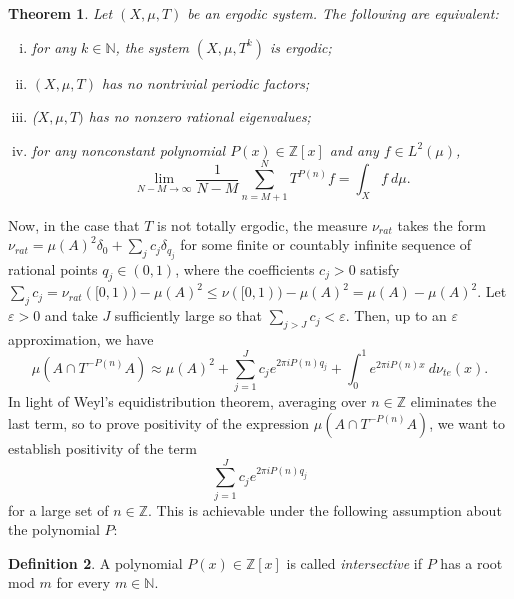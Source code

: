 \documentclass{amsart}
\newtheorem{theorem}{Theorem}[section]
\theoremstyle{definition}
\newtheorem{definition}[theorem]{Definition}
\numberwithin{equation}{section}
\newcommand{\N}{\mathbb{N}}
\newcommand{\Z}{\mathbb{Z}}
\newcommand{\eps}{\varepsilon}
\begin{document}
\begin{theorem} \label{thm: TE equivalences Z}
    Let $(X, \mu, T)$ be an ergodic system.
    The following are equivalent:
    \begin{enumerate}[(i)]
        \item for any $k \in \N$, the system $(X, \mu, T^k)$ is ergodic;
        \item $(X, \mu, T)$ has no nontrivial periodic factors;
        \item ($X, \mu, T)$ has no nonzero rational eigenvalues;
        \item for any nonconstant polynomial $P(x) \in \Z[x]$ and any $f \in L^2(\mu)$,
            \begin{equation*}
                \lim_{N-M \to \infty} \frac{1}{N-M} \sum_{n=M+1}^N T^{P(n)}f = \int_X f~d\mu.
            \end{equation*}
    \end{enumerate}
\end{theorem}

Now, in the case that $T$ is not totally ergodic, the measure $\nu_{rat}$ takes the form $\nu_{rat} = \mu(A)^2 \delta_0 + \sum_j c_j \delta_{q_j}$ for some finite or countably infinite sequence of rational points $q_j \in (0,1)$, where the coefficients $c_j > 0$ satisfy $\sum_j c_j = \nu_{rat}([0,1)) - \mu(A)^2 \le \nu([0,1)) - \mu(A)^2 = \mu(A) - \mu(A)^2$.
Let $\eps > 0$ and take $J$ sufficiently large so that $\sum_{j>J}c_j < \eps$.
Then, up to an $\eps$ approximation, we have
\begin{equation*}
    \mu(A \cap T^{-P(n)}A) \approx \mu(A)^2 + \sum_{j=1}^J c_j e^{2\pi i P(n)q_j} + \int_0^1 e^{2\pi i P(n)x}~d\nu_{te}(x).
\end{equation*}
In light of Weyl's equidistribution theorem, averaging over $n \in \Z$ eliminates the last term, so to prove positivity of the expression $\mu(A \cap T^{-P(n)}A)$, we want to establish positivity of the term
\begin{equation*}
    \sum_{j=1}^J c_j e^{2\pi i P(n)q_j}
\end{equation*}
for a large set of $n \in \Z$.
This is achievable under the following assumption about the polynomial $P$:

\begin{definition} \label{defn: intersective Z}
    A polynomial $P(x) \in \Z[x]$ is called \emph{intersective} if $P$ has a root mod $m$ for every $m \in \N$.
\end{definition}
\end{document}
